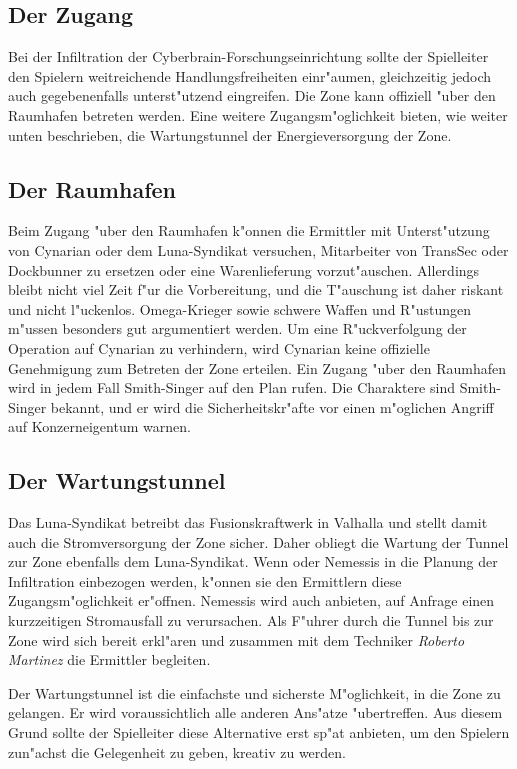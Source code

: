 \subsection{Der Zugang} 
Bei der Infiltration der Cyberbrain-Forschungseinrichtung sollte der Spielleiter den Spielern weitreichende Handlungsfreiheiten einr"aumen, gleichzeitig jedoch auch gegebenenfalls unterst"utzend eingreifen. Die Zone kann offiziell "uber den Raumhafen betreten werden. Eine weitere Zugangsm"oglichkeit bieten, wie weiter unten beschrieben, die Wartungstunnel der Energieversorgung der Zone.

\subsection{Der Raumhafen} 
Beim Zugang "uber den Raumhafen k"onnen die Ermittler mit Unterst"utzung von Cynarian oder dem Luna-Syndikat versuchen, Mitarbeiter von TransSec oder Dockbunner zu ersetzen oder eine Warenlieferung vorzut"auschen. Allerdings bleibt nicht viel Zeit f"ur die Vorbereitung, und die T"auschung ist daher riskant und nicht l"uckenlos. Omega-Krieger sowie schwere Waffen und R"ustungen m"ussen besonders gut argumentiert werden. Um eine R"uckverfolgung der Operation auf Cynarian zu verhindern, wird Cynarian keine offizielle Genehmigung zum Betreten der Zone erteilen. Ein Zugang "uber den Raumhafen wird in jedem Fall Smith-Singer auf den Plan rufen. Die Charaktere sind Smith-Singer bekannt, und er wird die Sicherheitskr"afte vor einen m"oglichen Angriff auf Konzerneigentum warnen. 

\subsection{Der Wartungstunnel} 
Das Luna-Syndikat betreibt das Fusionskraftwerk in Valhalla und stellt damit auch die Stromversorgung der Zone sicher. Daher obliegt die Wartung der Tunnel zur Zone ebenfalls dem Luna-Syndikat. Wenn \xl{} oder Nemessis in die Planung der Infiltration einbezogen werden, k"onnen sie den Ermittlern diese Zugangsm"oglichkeit er"offnen. Nemessis wird auch anbieten, auf Anfrage einen kurzzeitigen Stromausfall zu verursachen. Als F"uhrer durch die Tunnel bis zur Zone wird sich \xl{} bereit erkl"aren und zusammen mit dem Techniker \emph{Roberto Martinez} die Ermittler begleiten.

\begin{remarks}
	Der Wartungstunnel ist die einfachste und sicherste M"oglichkeit, in die Zone zu gelangen. Er wird voraussichtlich alle anderen Ans"atze "ubertreffen. Aus diesem Grund sollte der Spielleiter diese Alternative erst sp"at anbieten, um den Spielern zun"achst die Gelegenheit zu geben, kreativ zu werden.
\end{remarks}


